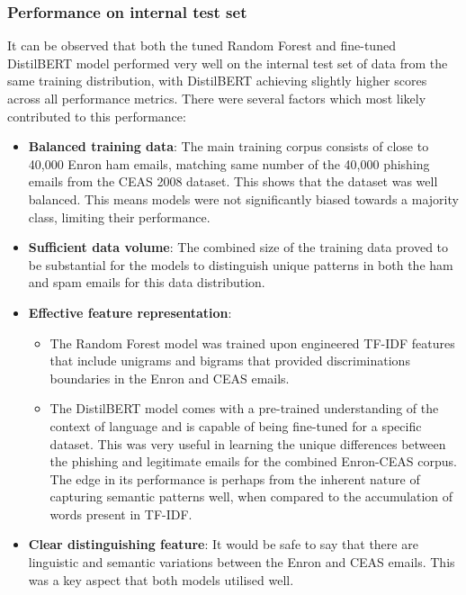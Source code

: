 
\subsubsection*{Performance on internal test set}
It can be observed that both the tuned Random Forest and fine-tuned DistilBERT model performed very well on the internal test set of data from the same training distribution, with DistilBERT achieving slightly higher scores across all performance metrics. There were several factors which most likely contributed to this performance:

\begin{itemize}
  \item \textbf{Balanced training data}: The main training corpus consists of close to 40,000 Enron ham emails, matching same number of the 40,000 phishing emails from the CEAS 2008 dataset. This shows that the dataset was well balanced. This means models were not significantly biased towards a majority class, limiting their performance.
  \item \textbf{Sufficient data volume}: The combined size of the training data proved to be substantial for the models to distinguish unique patterns in both the ham and spam emails for this data distribution.
  \item \textbf{Effective feature representation}:
  \begin{itemize}
    \item The Random Forest model was trained upon engineered TF-IDF features that include unigrams and bigrams that provided discriminations boundaries in the Enron and CEAS emails.
    \item The DistilBERT model comes with a pre-trained understanding of the context of language and is capable of being fine-tuned for a specific dataset. This was very useful in learning the unique differences between the phishing and legitimate emails for the combined Enron-CEAS corpus. The edge in its performance is perhaps from the inherent nature of capturing semantic patterns well, when compared to the accumulation of words present in TF-IDF.
  \end{itemize}
  \item \textbf{Clear distinguishing feature}: It would be safe to say that there are linguistic and semantic variations between the Enron and CEAS emails. This was a key aspect that both models utilised well.
\end{itemize}
